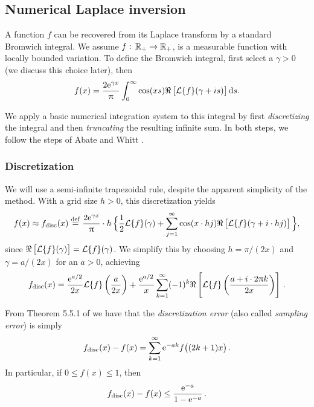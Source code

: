 \subsection{Numerical Laplace inversion}

A function $f$ can be recovered from its Laplace transform by a standard Bromwich integral.
We assume $f:\,\mathbb{R}_+ \to \mathbb{R}_+$, is a measurable function with locally bounded variation.
To define the Bromwich integral, first select a $\gamma > 0$ (we discuss this choice later), then
\[
f(x)=\frac{2\mathrm{e}^{\gamma x}}{\uppi}\int_{0}^{\infty}\cos(xs)\Re\left[\mathcal{L}\{f\}(\gamma + is)\right]\mathrm{d} s.
\]

We apply a basic numerical integration system to this integral by first \emph{discretizing} the integral and then \emph{truncating} the resulting infinite sum. In both steps, we follow the steps of Abate and Whitt \cite{Abate1992}.

\subsubsection{Discretization} \label{Sub:Discretization}

We will use a semi-infinite trapezoidal rule, despite the apparent simplicity of the method.
With a grid size $h>0$, this discretization yields
\[
f(x) \approx f_{\text{disc}}(x) \overset{\mathrm{def}}{=} \frac{2\mathrm{e}^{\gamma x}}{\uppi} \cdot h \, \Big \{ \frac12 \mathcal{L}\{f\}(\gamma) + \sum_{j=1}^\infty  \cos(x \cdot hj)\Re\left[\mathcal{L}\{f\}(\gamma + i \cdot hj)\right] \Big \},
\]
since  $\Re\left[\mathcal{L}\{f\}(\gamma)\right] = \mathcal{L}\{f\}(\gamma)$. We simplify this by choosing $h = \pi/(2 x)$ and $\gamma = a / (2 x)$ for an $a > 0$, achieving
\begin{equation} \label{DiscretizedInversion}
f_{\text{disc}}(x) = \frac{\mathrm{e}^{a/2}}{2x}\mathcal{L}\{f\} \left(\frac{a}{2 x}\right) + \frac{\mathrm{e}^{a/2}}{x} \sum_{k=1}^\infty (-1)^{k} \Re\left[\mathcal{L}\{f\}\left(\frac{a+ i \cdot 2\uppi k}{2 x}\right)\right] \,.
\end{equation}

From Theorem 5.5.1 of \cite{RoScScTe08} we have that the \emph{discretization error} (also called \emph{sampling error}) is simply
\begin{equation} \label{DiscretizationError}
    f_{\text{disc}}(x) - f(x) = \sum_{k=1}^\infty \mathrm{e}^{-a k} f\big( (2k+1) x \big) \,.
\end{equation}
In particular, if $0 \le f(x) \le 1$, then
\begin{equation} \label{BoundedDiscretizationError}
    f_{\text{disc}}(x) - f(x) \le \frac{\mathrm{e}^{-a}}{1-\mathrm{e}^{-a}} \,.
\end{equation}

